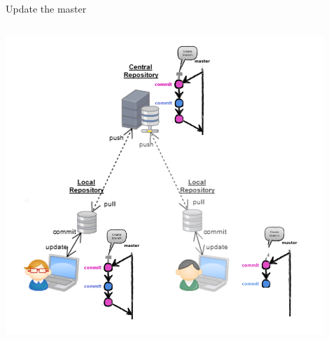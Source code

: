 \begin{frame}[fragile]{Update the master}
\begin{columns}
\begin{column}{0.4\textwidth}
\begin{center}
{			}\only<3-> {
				\includegraphics[width=0.9\textwidth]{multiuser_remote_merge.png}
			}
		\end{center}
	\end{column}
\end{columns}
\end{frame}


